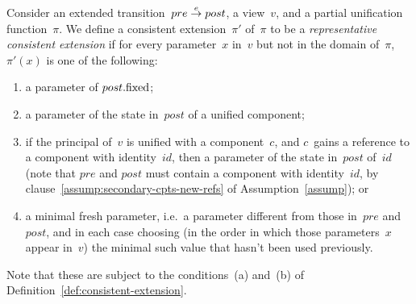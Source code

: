
\begin{definition}
\label{def:representative-consistent-extension}
Consider an extended transition~$pre \stackrel{e}\rightarrow post$, a view~$v$, and a
partial unification function~$\pi$.  We define a consistent extension~$\pi'$
of~$\pi$ to be a \emph{representative consistent extension} if for every
parameter~$x$ in~$v$ but not in the domain of~$\pi$,\, $\pi'(x)$ is one of the
following:
%
\begin{enumerate}
\item\label{clause:remap-1} a parameter of $post.\mathrm{fixed}$; 

\item\label{clause:remap-2} a parameter of the state in~$post$ of a unified
  component;

\item\label{clause:remap-3} if the principal of~$v$ is unified with a
  component~$c$, and $c$~gains a reference to a component with identity~$id$,
  then a parameter of the state in~$post$ of~$id$ (note that $pre$ and $post$
  must contain a component with identity~$id$, by
  clause~\ref{assump:secondary-cpts-new-refs} of Assumption~\ref{assump}); or

\item\label{clause:remap-4} a minimal fresh parameter, i.e.~a parameter
  different from those in~$pre$ and~$post$, and in each case choosing (in the
  order in which those parameters~$x$ appear in~$v$) the minimal such value
  that hasn't been used previously. 
\end{enumerate}
%
%
Note that these are subject to the conditions~(a) and~(b) of
Definition~\ref{def:consistent-extension}. 
\end{definition}
%


